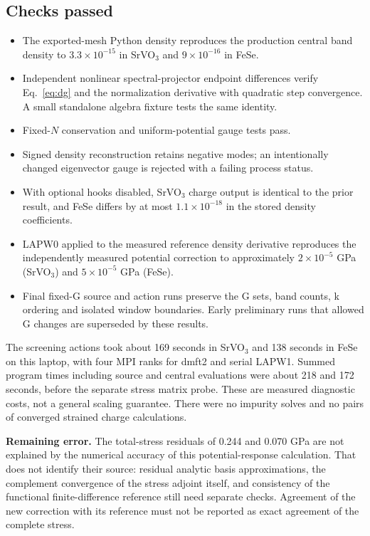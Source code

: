 \documentclass[11pt]{article}
\begin{document}
\subsection*{Checks passed}
\begin{itemize}
\item The exported-mesh Python density reproduces the production central
band density to $3.3\times10^{-15}$ in SrVO$_3$ and $9\times10^{-16}$ in FeSe.
\item Independent nonlinear spectral-projector endpoint differences verify
Eq.~\eqref{eq:dg} and the normalization derivative with quadratic step
convergence. A small standalone algebra fixture tests the same identity.
\item Fixed-$N$ conservation and uniform-potential gauge tests pass.
\item Signed density reconstruction retains negative modes; an intentionally
changed eigenvector gauge is rejected with a failing process status.
\item With optional hooks disabled, SrVO$_3$ charge output is identical to
the prior result, and FeSe differs by at most $1.1\times10^{-18}$ in the
stored density coefficients.
\item LAPW0 applied to the measured reference density derivative reproduces
the independently measured potential correction to approximately
$2\times10^{-5}$ GPa (SrVO$_3$) and $5\times10^{-5}$ GPa (FeSe).
\item Final fixed-G source and action runs preserve the G sets, band counts,
k ordering and isolated window boundaries. Early preliminary runs that
allowed G changes are superseded by these results.
\end{itemize}

The screening actions took about 169 seconds in SrVO$_3$ and 138 seconds in
FeSe on this laptop, with four MPI ranks for dmft2 and serial LAPW1.
Summed program times including source and central evaluations were about
218 and 172 seconds, before the separate stress matrix probe. These are
measured diagnostic costs, not a general scaling guarantee. There were no
impurity solves and no pairs of converged strained charge calculations.

\textbf{Remaining error.} The total-stress residuals of 0.244 and 0.070 GPa
are not explained by the numerical accuracy of this potential-response
calculation. That does not identify their source: residual analytic basis
approximations, the complement convergence of the stress adjoint itself,
and consistency of the functional finite-difference reference still need
separate checks. Agreement of the new correction with its reference must
not be reported as exact agreement of the complete stress.
\end{document}
